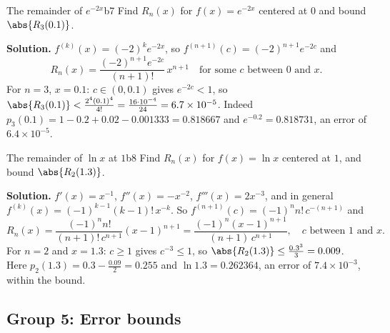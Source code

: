 \documentclass[11pt]{article}
\begin{document}
\begin{exmp}{The remainder of $e^{-2x}$}{b7}
Find $R_n(x)$ for $f(x)=e^{-2x}$ centered at $0$ and bound $\abs{R_3(0.1)}$.

\textbf{Solution.} $f^{(k)}(x)=(-2)^ke^{-2x}$, so $f^{(n+1)}(c)=(-2)^{n+1}e^{-2c}$ and
\[
R_n(x)=\frac{(-2)^{n+1}e^{-2c}}{(n+1)!}\,x^{n+1}\quad\text{for some }c\text{ between }0\text{ and }x.
\]
For $n=3$, $x=0.1$: $c\in(0,0.1)$ gives $e^{-2c}<1$, so $\abs{R_3(0.1)}<\frac{2^4(0.1)^4}{4!}=\frac{16\cdot10^{-4}}{24}=6.7\times10^{-5}$. Indeed $p_3(0.1)=1-0.2+0.02-0.001333=0.818667$ and $e^{-0.2}=0.818731$, an error of $6.4\times10^{-5}$.
\end{exmp}

\begin{exmp}{The remainder of $\ln x$ at $1$}{b8}
Find $R_n(x)$ for $f(x)=\ln x$ centered at $1$, and bound $\abs{R_2(1.3)}$.

\textbf{Solution.} $f'(x)=x^{-1}$, $f''(x)=-x^{-2}$, $f'''(x)=2x^{-3}$, and in general $f^{(k)}(x)=(-1)^{k-1}(k-1)!\,x^{-k}$. So $f^{(n+1)}(c)=(-1)^nn!\,c^{-(n+1)}$ and
\[
R_n(x)=\frac{(-1)^nn!}{(n+1)!\,c^{n+1}}(x-1)^{n+1}=\frac{(-1)^n(x-1)^{n+1}}{(n+1)\,c^{n+1}},\quad c\text{ between }1\text{ and }x.
\]
For $n=2$ and $x=1.3$: $c\ge1$ gives $c^{-3}\le1$, so $\abs{R_2(1.3)}\le\frac{0.3^3}3=0.009$. Here $p_2(1.3)=0.3-\frac{0.09}2=0.255$ and $\ln1.3=0.262364$, an error of $7.4\times10^{-3}$, within the bound.
\end{exmp}

\subsection*{Group 5: Error bounds}
\end{document}
